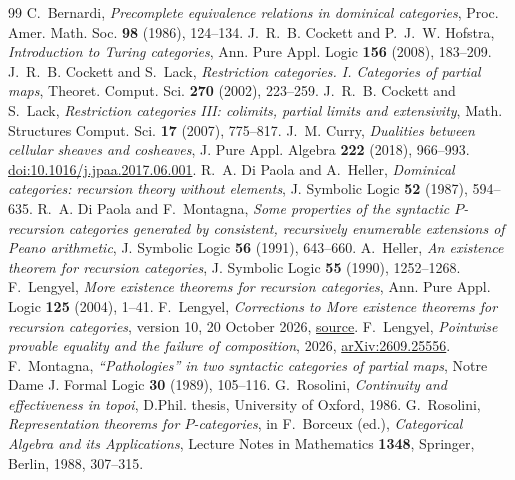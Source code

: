 \documentclass[11pt]{article}
\begin{document}
\begin{thebibliography}{99}
\small
{}
C.~Bernardi, \emph{Precomplete equivalence relations in dominical
categories}, Proc. Amer. Math. Soc. \textbf{98} (1986), 124--134.
J.~R.~B. Cockett and P.~J.~W. Hofstra,
\emph{Introduction to Turing categories},
Ann. Pure Appl. Logic \textbf{156} (2008), 183--209.
J.~R.~B. Cockett and S.~Lack, \emph{Restriction categories. I.
Categories of partial maps}, Theoret. Comput. Sci. \textbf{270}
(2002), 223--259.
J.~R.~B. Cockett and S.~Lack,
\emph{Restriction categories III: colimits, partial limits and extensivity},
Math. Structures Comput. Sci. \textbf{17} (2007), 775--817.
J.~M. Curry, \emph{Dualities between cellular sheaves and cosheaves},
J. Pure Appl. Algebra \textbf{222} (2018), 966--993.
\href{https://doi.org/10.1016/j.jpaa.2017.06.001}
{doi:10.1016/j.jpaa.2017.06.001}.
R.~A. Di Paola and A.~Heller, \emph{Dominical categories:
recursion theory without elements}, J. Symbolic Logic
\textbf{52} (1987), 594--635.
R.~A. Di Paola and F.~Montagna, \emph{Some properties of the syntactic
$P$-recursion categories generated by consistent, recursively enumerable
extensions of Peano arithmetic}, J. Symbolic Logic \textbf{56} (1991),
643--660.
A.~Heller, \emph{An existence theorem for recursion categories},
J. Symbolic Logic \textbf{55} (1990), 1252--1268.
F.~Lengyel, \emph{More existence theorems for recursion categories},
Ann. Pure Appl. Logic \textbf{125} (2004), 1--41.
F.~Lengyel, \emph{Corrections to More existence theorems for recursion
categories}, version 10, 20 October 2026,
\href{https://github.com/flengyel/errata/blob/5555e4fa1da7b8e3a0836dd1fbf1ca385cacd03b/lengyel2004/lengyel2004_repairs_v10.tex}{source}.
F.~Lengyel, \emph{Pointwise provable equality and the failure of
composition}, 2026,
\href{https://arxiv.org/abs/2609.25556}{arXiv:2609.25556}.
F.~Montagna, \emph{``Pathologies'' in two syntactic categories of partial
maps}, Notre Dame J. Formal Logic \textbf{30} (1989), 105--116.
G.~Rosolini, \emph{Continuity and effectiveness in topoi}, D.Phil.
thesis, University of Oxford, 1986.
G.~Rosolini, \emph{Representation theorems for $P$-categories},
in F.~Borceux (ed.), \emph{Categorical Algebra and its Applications},
Lecture Notes in Mathematics \textbf{1348}, Springer, Berlin, 1988,
307--315.
\end{thebibliography}
\end{document}
